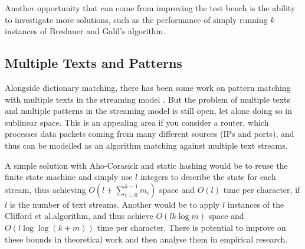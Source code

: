 \documentclass[ %
                    author={Dominic Joseph Moylett},
                    degree={MEng},
                     title={Dictionary Matching with Fingerprints},
                  subtitle={An Empirical Analysis},
                      type={research},
                      year={2015} ]{dissertation}
\begin{document}
Another opportunity that can come from improving the test bench is the ability to investigate more solutions, such as the performance of simply running $k$ instances of Breslauer and Galil's algorithm.

\subsection{Multiple Texts and Patterns}

Alongside dictionary matching, there has been some work on pattern matching with multiple texts in the streaming model \cite{DBLP:journals/corr/abs-1202-3470}. But the problem of multiple texts and multiple patterns in the streaming model is still open, let alone doing so in sublinear space. This is an appealing area if you consider a router, which processes data packets coming from many different sources (IPs and ports), and thus can be modelled as an algorithm matching against multiple text streams.

A simple solution with Aho-Corasick and static hashing would be to reuse the finite state machine and simply use $l$ integers to describe the state for each stream, thus achieving $O(l + \sum_{i = 0}^{k - 1}m_i)$ space and $O(l)$ time per character, if $l$ is the number of text streams. Another would be to apply $l$ instances of the Clifford et al.\@ algorithm, and thus achieve $O(lk\log m)$ space and $O(l\log\log(k + m))$ time per character. There is potential to improve on these bounds in theoretical work and then analyse them in empirical research.


%
%

\backmatter





\appendix

\end{document}
